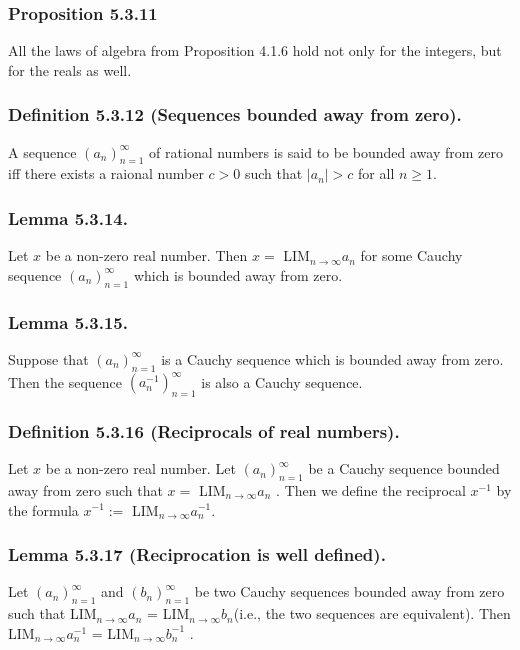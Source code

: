 \documentclass[12pt, letter]{article}
\newcommand{\ssc}{\subsubsection* }
\newcommand{\an}{$(a_n)_{n=1}^\infty$ }
\newcommand{\bn}{$(b_n)_{n=1}^\infty$ }
\newcommand{\la}{LIM$_{n\to\infty}a_n$  }
\newcommand{\lb}{LIM$_{n\to\infty}b_n$}
\newcommand{\lao}{LIM$_{n\to\infty}a_n^{-1}$ }
\newcommand{\lbo}{LIM$_{n\to\infty}b_n^{-1}$ }
\begin{document}
\subsubsection*{Proposition 5.3.11}
All the laws of algebra from Proposition 4.1.6 hold not only for the integers, but for the reals as well.
\subsubsection*{Definition 5.3.12 (Sequences bounded away from zero).}
A sequence \an of rational numbers is said to be bounded away from zero iff there exists a raional number $c>0$ such that $|a_n|>c$ for all $n\geq 1$.
\subsubsection*{Lemma 5.3.14.}
Let $x$ be a non-zero real number. Then $x=$ \la for some Cauchy sequence \an which is bounded away from zero.
\subsubsection*{Lemma 5.3.15.}
Suppose that \an is a Cauchy sequence which is bounded away from zero. Then the sequence $(a_n^{-1})_{n=1}^\infty$ is also a Cauchy sequence.
\ssc{Definition 5.3.16 (Reciprocals of real numbers).}
Let $x$ be a non-zero real number. Let \an be a Cauchy sequence bounded away from zero such that $x=$ \la. Then we define the reciprocal $x^{-1}$ by the formula
$x^{-1}:=$ LIM$_{n\to\infty}a_n^{-1}$. 
\subsubsection*{Lemma 5.3.17 (Reciprocation is well defined).}
Let \an and \bn be two Cauchy sequences bounded away from zero such that \la = \lb (i.e., the two sequences are equivalent). Then \lao = \lbo.
\end{document}
